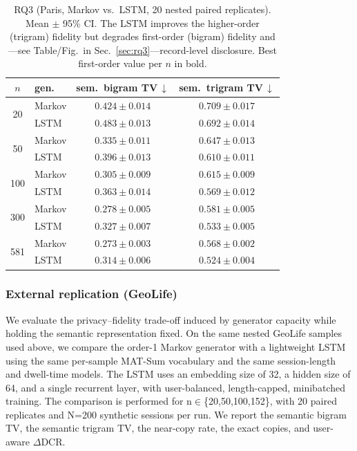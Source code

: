 \documentclass[sigconf,nonacm]{acmart}
\begin{document}
\begin{table}[t]
  \caption{RQ3 (Paris, Markov vs.\ LSTM, 20 nested paired replicates). Mean $\pm$ 95\% CI.
  The LSTM improves the higher-order (trigram) fidelity but degrades first-order (bigram)
  fidelity and---see Table/Fig.\ in Sec.~\ref{sec:rq3}---record-level disclosure. Best
  first-order value per $n$ in bold.}
  \label{tab:rq3-trigram}
  \small
  \begin{tabular}{@{}clcc@{}}
    \toprule
    $n$ & gen. & sem.\ bigram TV\,$\downarrow$ & sem.\ trigram TV\,$\downarrow$ \\
    \midrule
    \multirow{2}{*}{20}  & Markov & $\mathbf{0.424{\pm}0.014}$ & $0.709{\pm}0.017$ \\
                         & LSTM   & $0.483{\pm}0.013$ & $0.692{\pm}0.014$ \\
    \midrule
    \multirow{2}{*}{50}  & Markov & $\mathbf{0.335{\pm}0.011}$ & $0.647{\pm}0.013$ \\
                         & LSTM   & $0.396{\pm}0.013$ & $0.610{\pm}0.011$ \\
    \midrule
    \multirow{2}{*}{100} & Markov & $\mathbf{0.305{\pm}0.009}$ & $0.615{\pm}0.009$ \\
                         & LSTM   & $0.363{\pm}0.014$ & $0.569{\pm}0.012$ \\
    \midrule
    \multirow{2}{*}{300} & Markov & $\mathbf{0.278{\pm}0.005}$ & $0.581{\pm}0.005$ \\
                         & LSTM   & $0.327{\pm}0.007$ & $0.533{\pm}0.005$ \\
    \midrule
    \multirow{2}{*}{581} & Markov & $\mathbf{0.273{\pm}0.003}$ & $0.568{\pm}0.002$ \\
                         & LSTM   & $0.314{\pm}0.006$ & $0.524{\pm}0.004$ \\
    \bottomrule
  \end{tabular}
\end{table}



\subsubsection*{External replication (GeoLife)}
\label{sec:geolife-e3}

We evaluate the privacy–fidelity trade-off induced by generator capacity while holding the semantic representation fixed. On the same nested GeoLife samples used above, we compare the order-1 Markov generator with a lightweight LSTM using the same per-sample MAT-Sum vocabulary and the same session-length and dwell-time models. The LSTM uses an embedding size of 32, a hidden size of 64, and a single recurrent layer, with user-balanced, length-capped, minibatched training. The comparison is performed for n$\in$\{20,50,100,152\}, with 20 paired replicates and N=200 synthetic sessions per run. We report the semantic bigram TV, the semantic trigram TV, the near-copy rate, the exact copies, and user-aware $\Delta$DCR.
\end{document}

